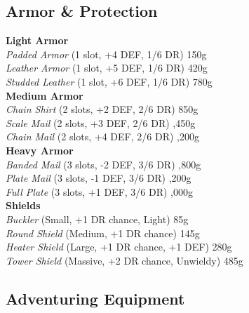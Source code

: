 \documentclass[10pt,twoside]{article}
\begin{document}
\subsection{Armor \& Protection}

\begin{multicols}{2}
\textbf{Light Armor} \\
\textit{Padded Armor} (1 slot, +4 DEF, 1/6 DR) \dotfill 150g \\
\textit{Leather Armor} (1 slot, +5 DEF, 1/6 DR) \dotfill 420g \\
\textit{Studded Leather} (1 slot, +6 DEF, 1/6 DR) \dotfill 780g \\

\textbf{Medium Armor} \\
\textit{Chain Shirt} (2 slots, +2 DEF, 2/6 DR) \dotfill 850g \\
\textit{Scale Mail} (2 slots, +3 DEF, 2/6 DR) ,450g \\
\textit{Chain Mail} (2 slots, +4 DEF, 2/6 DR) ,200g \\

\textbf{Heavy Armor} \\
\textit{Banded Mail} (3 slots, -2 DEF, 3/6 DR) ,800g \\
\textit{Plate Mail} (3 slots, -1 DEF, 3/6 DR) ,200g \\
\textit{Full Plate} (3 slots, +1 DEF, 3/6 DR) ,000g \\

\textbf{Shields} \\
\textit{Buckler} (Small, +1 DR chance, Light) \dotfill 85g \\
\textit{Round Shield} (Medium, +1 DR chance) \dotfill 145g \\
\textit{Heater Shield} (Large, +1 DR chance, +1 DEF) \dotfill 280g \\
\textit{Tower Shield} (Massive, +2 DR chance, Unwieldy) \dotfill 485g \\
\end{multicols}

\subsection{Adventuring Equipment}
\end{document}
